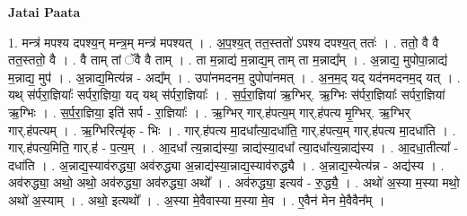 \documentclass[17pt]{extarticle}
\begin{document}
\textbf{Jatai Paata} \newline

1. मन्त्र॑ मपश्य दपश्य॒न् मन्त्र॒म् मन्त्र॑ मपश्यत् । . अ॒प॒श्य॒त् तत॒स्ततो॑ ऽपश्य दपश्य॒त् ततः॑ । . ततो॒ वै वै तत॒स्ततो॒ वै । . वै ताम् तां ॅवै वै ताम् । . ता म॒न्नाद्य॑ म॒न्नाद्य॒म् ताम् ता म॒न्नाद्य᳚म् । . अ॒न्नाद्य॒ मुपोपा॒न्नाद्य॑ म॒न्नाद्य॒ मुप॑ । . अ॒न्नाद्य॒मित्य॑न्न - अद्य᳚म् । . उपा॑नमदनम॒ दुपोपा॑नमत् । . अ॒न॒म॒द् यद् यद॑नमदनम॒द् यत् । . यथ् स॑र्परा॒ज्ञियाः᳚ सर्परा॒ज्ञिया॒ यद् यथ् स॑र्परा॒ज्ञियाः᳚ । . स॒र्प॒रा॒ज्ञिया॑ ऋ॒ग्भिर्. ऋ॒ग्भिः स॑र्परा॒ज्ञियाः᳚ सर्परा॒ज्ञिया॑ ऋ॒ग्भिः । . स॒र्प॒रा॒ज्ञिया॒ इति॑ सर्प - रा॒ज्ञियाः᳚ । . ऋ॒ग्भिर् गार्.ह॑पत्य॒म् गार्.ह॑पत्य मृ॒ग्भिर्. ऋ॒ग्भिर् गार्.ह॑पत्यम् । . ऋ॒ग्भिरित्यृ॑क् - भिः । . गार्.ह॑पत्य मा॒दधा᳚त्या॒दधा॑ति॒ गार्.ह॑पत्य॒म् गार्.ह॑पत्य मा॒दधा॑ति । . गार्.ह॑पत्य॒मिति॒ गार्.ह॑ - प॒त्य॒म् । . आ॒दधा᳚ त्य॒न्नाद्य॑स्या॒ न्नाद्य॑स्या॒दधा᳚ त्या॒दधा᳚त्य॒न्नाद्य॑स्य । . आ॒दधा॒तीत्या᳚ - दधा॑ति । . अ॒न्नाद्य॒स्याव॑रुद्ध्या॒ अव॑रुद्ध्या अ॒न्नाद्य॑स्या॒न्नाद्य॒स्याव॑रुद्ध्यै । . अ॒न्नाद्य॒स्येत्य॑न्न - अद्य॑स्य । . अव॑रुद्ध्या॒ अथो॒ अथो॒ अव॑रुद्ध्या॒ अव॑रुद्ध्या॒ अथो᳚ । . अव॑रुद्ध्या॒ इत्यव॑ - रु॒द्ध्यै॒ । . अथो॑ अ॒स्या म॒स्या मथो॒ अथो॑ अ॒स्याम् । . अथो॒ इत्यथो᳚ । . अ॒स्या मे॒वैवास्या म॒स्या मे॒व । . ए॒वैन॑ मेन मे॒वैवैन᳚म् । \newline
\end{document}
